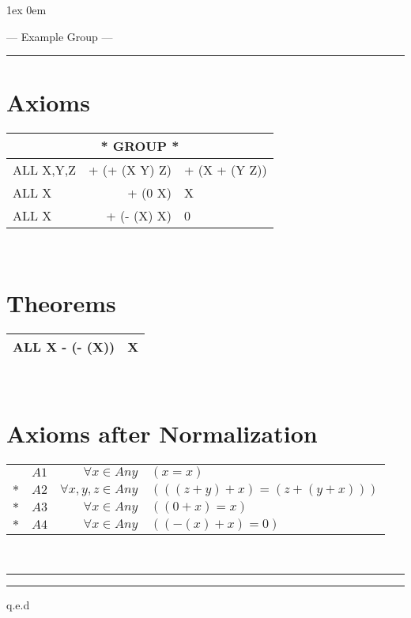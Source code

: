 
\evensidemargin-0.4cm
\parskip1ex
\parindent0em
\raggedbottom




\centerline{--- Example Group ---}
\medskip\hrule
{\center 
\section*{Axioms}
\begin{tabular}{|l@{\ \ }r@{\ =\ }l|}
\hline
\multicolumn{3}{|c|}{* GROUP *}\\
\hline
ALL X,Y,Z & + (+ (X Y) Z) & + (X + (Y Z)) \\
ALL X & + (0 X) & X \\
ALL X & + (- (X) X) & 0 \\
\hline
\end{tabular}
\\
\section*{Theorems}
\begin{tabular}{|r@{\ =\ }l|}
\hline
ALL X - (- (X)) & X \\
\hline
\end{tabular}
\\
\section*{Axioms after Normalization}
\begin{tabular}{|r@{\ }l@{\ \ }r@{:\ \ }l|}
\hline
& $A1$ & $\forall x\!\in\! Any$ & $(x=x)$ \\
$\ast$ & $A2$ & $\forall x,y,z\!\in\! Any$ & $ (((z+y)+x)=(z+(y+x)))$ \\
$\ast$ & $A3$ & $\forall x\!\in\! Any$ & $((0+x)=x)$ \\
$\ast$ & $A4$ & $\forall x\!\in\! Any$ & $((-(x)+x)=0)$ \\
\hline
\end{tabular}
\\
\bigskip \bigskip
\hrule height 2pt \vskip 3pt \hrule
q.e.d
}









